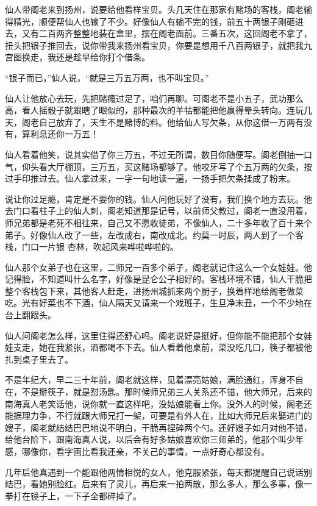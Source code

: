 仙人带阁老来到扬州，说要给他看样宝贝。头几天住在那家有赌场的客栈，阁老输得精光，顺便帮仙人也输了不少。好像仙人有输不完的钱，前五十两银子刚砸进去，又有二百两齐整整地装在盒里，摆在阁老面前。三番五次，这回阁老不拿了，扭头把银子推回去，说你带我来扬州看宝贝，你要是想用千八百两银子，就把我九宫图换走，我还是趁早给你打个借条。

“银子而已，”仙人说，“就是三万五万两，也不叫宝贝。”

仙人让他放心去玩，先把赌瘾过足了，咱们再聊。可阁老不是小五子，武功那么高，看人摇骰子就跟瞎了眼似的，那种最次的羊牯都能把他赢得晕头转向。连玩几天，阁老自己放弃了，天生不是赌博的料。他给仙人写欠条，从你这借一万两有没有，算利息还你一万五！

仙人看着他笑，说其实借了你三万五，不过无所谓，数目你随便写。阁老倒抽一口气，仰头看大厅棚顶，三万五，买这赌场都够了。他咬牙写了个五万两的欠条，按过手印推过去。仙人拿过来，一字一句地读一遍，一扬手把欠条揉成了粉末。

说让你过足瘾，肯定是不要你的钱。仙人问他玩好了没有，我们换个地方去玩。他去门口看柱子上的仙人刺，阁老知道那是记号，以前师父教过，阁老一直没用着，师兄弟都是老死不相往来，自己又不愿收徒弟，不像仙人，二十多年收了百十来个弟子。好像仙人改了一些，左改成右，南改成北。约莫一时辰，两人到了一个客栈，门口一片银
杏林，吹起风来哗啦哗啦的。

仙人那个女弟子也在这里，二师兄一百多个弟子，阁老就记住这么一个女娃娃。他记得脸，不知道叫什么名字，好像是昆仑公子相好的。客栈环境不错，仙人干脆把整个客栈包下来，其他客人赶走，进扬州城抓来两个厨子，换着样地给阁老做菜吃。光有好菜也不下酒，仙人隔天又请来一个戏班子，生旦净末丑，一个不少地在台上翻跟头。

仙人问阁老怎么样，这里住得还舒心吗。阁老说好是挺好，但你能不能把那个女娃娃支走，她在我紧张，酒都喝不下去。仙人看着他桌前，菜没吃几口，筷子都被他扎到桌子里去了。

不是年纪大，早二三十年前，阁老就这样，见着漂亮姑娘，满脸通红，浑身不自在，不是掰筷子，就是怼汤匙。那时候师兄弟三人关系还不错，他大师兄，后来的南海真人老笑话他，说你就一直这样吧，没姑娘能看上你。没外人的时候，阁老还能据理力争，不行就跟大师兄打一架，可要是有外人在，比如大师兄后来娶进门的嫂子，阁老就结结巴巴地说不明白，干脆再捏碎两个勺。还好嫂子如月对他不错，给他台阶下，跟南海真人说，以后会有好多姑娘喜欢你三师弟的，他那个叫少年感，哪像你，看字画比看我还亲，不关己的事情，一点好奇心都没有。

几年后他真遇到一个能跟他两情相悦的女人，他克服紧张，每天都提醒自己说话别结巴，看她别脸红。后来有了灵儿，再后来一拍两散，那么多人，那么多事，像一拳打在镜子上，一下子全都碎掉了。

